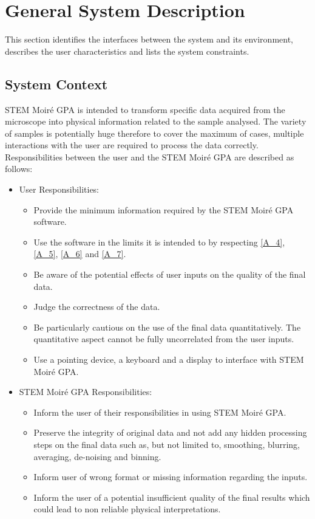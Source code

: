 \documentclass[12pt]{article}
\newcommand{\progname}{STEM Moir{\'e} GPA}
\begin{document}
\section{General System Description}

This section identifies the interfaces between the system and its environment,
describes the user characteristics and lists the system constraints.

\subsection{System Context}

\progname{} is intended to transform specific data acquired from the microscope 
into physical information related to the sample analysed. The variety of samples 
is potentially huge therefore to cover the maximum of cases, multiple 
interactions with the user are required to process the data correctly. 
Responsibilities between the user and the \progname{} are described as follows:

\begin{itemize}
\item User Responsibilities:
\begin{itemize}
\item Provide the minimum information required by the \progname{} software.
\item Use the software in the limits it is intended to by respecting \cref{A_4}, 
\cref{A_5}, \cref{A_6} and \cref{A_7}.
\item Be aware of the potential effects of user inputs on the quality of the 
final data.
\item Judge the correctness of the data.
\item Be particularly cautious on the use of the final data quantitatively. The 
quantitative aspect cannot be fully uncorrelated from the user inputs. 
\item Use a pointing device, a keyboard and a display to interface with 
\progname{}.
\end{itemize}
\item \progname{} Responsibilities:
\begin{itemize}
\item Inform the user of their responsibilities in using \progname{}.
\item Preserve the integrity of original data and not add any hidden processing 
steps on the final data such as, but not limited to, smoothing, blurring, 
averaging, de-noising and binning.
\item Inform user of wrong format or missing information regarding the inputs.
\item Inform the user of a potential insufficient quality of the final results 
which could lead to non reliable physical interpretations.
\end{itemize}
\end{itemize}
\end{document}
